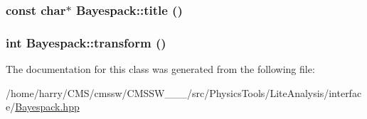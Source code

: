 \hypertarget{classBayespack_a9}{
\subsubsection[title]{\setlength{\rightskip}{0pt plus 5cm}const char$\ast$ Bayespack::title ()}}
\label{classBayespack_a9}


\hypertarget{classBayespack_a10}{
\subsubsection[transform]{\setlength{\rightskip}{0pt plus 5cm}int Bayespack::transform ()}}
\label{classBayespack_a10}




The documentation for this class was generated from the following file:\begin{CompactItemize}
\item 
/home/harry/CMS/cmssw/CMSSW\_\_\_/src/Physics\-Tools/Lite\-Analysis/interface/\hyperlink{Bayespack_8hpp}{Bayespack.hpp}\end{CompactItemize}
